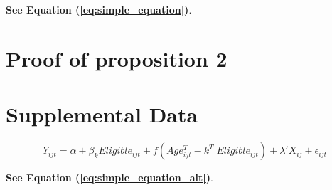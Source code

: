 \documentclass{article}
\begin{document}
\blindtext \textbf{See Equation (\ref{eq:simple_equation})}.

\section{Proof of proposition 2}
\blindtext[3]

\section{Supplemental Data}
\setcounter{equation}{0}%

    \begin{equation}%
        \label{eq:simple_equation_alt}%
        Y_{ijt} = \alpha + \beta_kEligible_{ijt} + f (Age^T_{ijt}-k^T | 
        Eligible_{ijt}) + \lambda'X_{ij} + \epsilon_{ijt}
    \end{equation}

\blindtext \textbf{See Equation (\ref{eq:simple_equation_alt})}.
\end{document}
